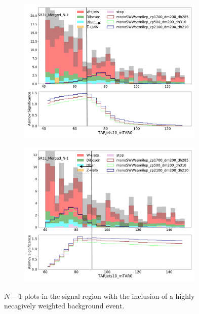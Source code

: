 \begin{figure}[htbp]
\begin{subfigure}{0.49\textwidth}
     \includegraphics[width = 0.98\textwidth]{Figures/4/N1n/TARJets10_mTAR0.pdf}
     \caption{\mTAR}
     \end{subfigure}
     \begin{subfigure}{0.49\textwidth}
     \includegraphics[width = 0.98\textwidth]{Figures/4/N1n/TARJets10_mTAR02.pdf}
     \caption{\mTAR}
     \end{subfigure}

     \caption{$N-1$ plots in the \merged signal region with the inclusion of a highly necagively weighted background event.}
     \label{fig:SRN1_backup}
  \end{figure}
\FloatBarrier
